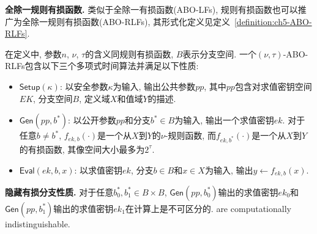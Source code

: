 \medskip\noindent\textbf{全除一规则有损函数.} 类似于全除一有损函数(ABO-LFs), 规则有损函数也可以推广为全除一规则有损函数(ABO-RLFs), 其形式化定义见定义~\ref{definition:ch5-ABO-RLFs}.
\begin{definition}[全除一有损函数]\label{definition:ch5-ABO-RLFs}
在定义中, 参数$n$, $\nu$, $\tau$的含义同规则有损函数, $B$表示分支空间. 一个$(\nu, \tau)$-ABO-RLFs包含以下三个多项式时间算法并满足以下性质:
\begin{itemize} \itemsep 1pt \parskip 0pt \parsep 0pt
\item $\mathsf{Setup}(\kappa)$: 以安全参数$\kappa$为输入, 输出公共参数$pp$, 其中$pp$包含对求值密钥空间$EK$, 分支空间$B$, 定义域$X$和值域$Y$的描述. 

\item $\mathsf{Gen}(pp, b^*)$: 以公开参数$pp$和分支$b^* \in B$为输入, 输出一个求值密钥$ek$. 
对于任意$b \neq b^*$, $f_{ek,b}(\cdot)$是一个从$X$到$Y$的$\nu$-规则函数, 
	而$f_{ek,b^*}(\cdot)$是一个从$X$到$Y$的有损函数, 其像空间大小最多为$2^{\tau}$.

\item $\mathsf{Eval}(ek, b, x)$: 以求值密钥$ek$, 分支$b \in B$和$x \in X$为输入, 输出$y \leftarrow f_{ek, b}(x)$. 
\end{itemize}

\begin{trivlist}
\item \textbf{隐藏有损分支性质.} 对于任意$b_0^*, b_1^* \in B \times B$, $\mathsf{Gen}(pp, b_0^*)$输出的求值密钥$ek_0$和$\mathsf{Gen}(pp, b_1^*)$输出的求值密钥$ek_1$在计算上是不可区分的. 
	are computationally indistinguishable.
\end{trivlist}
\end{definition}

